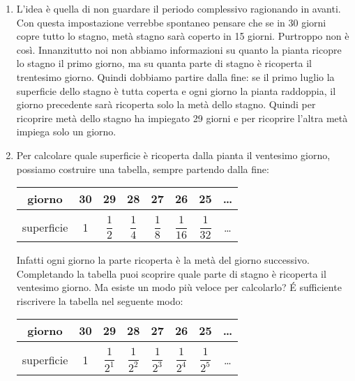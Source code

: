 \begin{enumerate}
 \item
L'idea è quella di non guardare il periodo complessivo 
ragionando in avanti. Con questa impostazione verrebbe spontaneo pensare 
che se 
in 30 giorni copre tutto lo stagno, metà stagno sarà coperto in 15 giorni. 
Purtroppo non 
è così.
Innanzitutto noi non abbiamo informazioni su quanto la pianta ricopre lo 
stagno il primo 
giorno, ma su quanta parte di stagno è ricoperta il trentesimo giorno.
Quindi dobbiamo partire dalla fine: se il primo luglio la superficie dello 
stagno è tutta coperta e ogni giorno la pianta raddoppia, il giorno 
precedente 
sarà ricoperta solo la metà dello stagno. Quindi per ricoprire metà dello 
stagno 
ha impiegato 29 giorni e per ricoprire l'altra metà impiega solo un giorno.

 \item
Per calcolare quale superficie è ricoperta dalla pianta il ventesimo 
giorno, 
possiamo costruire una tabella, sempre partendo dalla fine:

\begin{center}
\begin{tabular}{c|c|c|c|c|c|c|c}
giorno & 30 & 29 & 28 & 27 & 26 & 25 & \dots \\[6pt]
\hline &&&&&&\\ [-6pt]
superficie & 1 & \(\dfrac{1}{2}\) & 
 \(\dfrac{1}{4}\) & 
 \(\dfrac{1}{8}\) & 
 \(\dfrac{1}{16}\) & 
 \(\dfrac{1}{32}\) & \dots \\
\end{tabular}
\end{center}

Infatti ogni giorno la parte ricoperta è la metà del giorno successivo.
Completando la tabella puoi scoprire quale parte di stagno è ricoperta il 
ventesimo giorno. Ma esiste un modo più veloce per calcolarlo?
\'E sufficiente riscrivere la tabella nel seguente modo:

\begin{center}
\begin{tabular}{c|c|c|c|c|c|c|c}
giorno & 30 & 29 & 28 & 27 & 26 & 25 & \dots \\[6pt]
\hline &&&&&&\\ [-6pt]
superficie & 1 & \(\dfrac{1}{2^1}\) & 
 \(\dfrac{1}{2^2}\) & 
 \(\dfrac{1}{2^3}\) & 
 \(\dfrac{1}{2^4}\) & 
 \(\dfrac{1}{2^5}\) & \dots \\
\end{tabular}
\end{center}


\end{enumerate}
